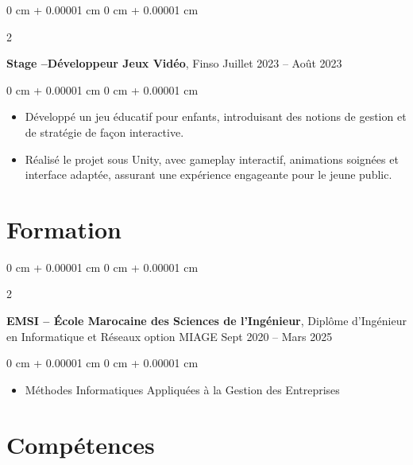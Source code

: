 \documentclass[10pt, letterpaper]{article}
\newenvironment{highlights}{
    \begin{itemize}[
        topsep=0.10 cm,
        parsep=0.10 cm,
        partopsep=0pt,
        itemsep=0pt,
        leftmargin=0 cm + 10pt
    ]
}{
    \end{itemize}
} %
\newenvironment{onecolentry}{
    \begin{adjustwidth}{
        0 cm + 0.00001 cm
    }{
        0 cm + 0.00001 cm
    }
}{
    \end{adjustwidth}
} %
\newenvironment{twocolentry}[2][]{
    \onecolentry
    \def\secondColumn{#2}
    \setcolumnwidth{\fill, 4.5 cm}
    \begin{paracol}{2}
}{
    \switchcolumn \raggedleft \secondColumn
    \end{paracol}
    \endonecolentry
} %
\begin{document}
        \vspace{0.2 cm}

        \begin{twocolentry}{
            Juillet 2023 – Août 2023
        }
            \textbf{Stage –Développeur Jeux Vidéo}, Finso\end{twocolentry}

        \vspace{0.10 cm}
        \begin{onecolentry}
            \begin{highlights}
                \item Développé un jeu éducatif pour enfants, introduisant des notions de gestion et de stratégie de façon interactive.  
                \item Réalisé le projet sous Unity, avec gameplay interactif, animations soignées et interface adaptée, assurant une expérience engageante pour le jeune public.
            \end{highlights}
        \end{onecolentry}



    \section{Formation}



        
        \begin{twocolentry}{
            Sept 2020 – Mars 2025
        }
            \textbf{EMSI – École Marocaine des Sciences de l’Ingénieur}, Diplôme d’Ingénieur en Informatique et Réseaux option MIAGE \end{twocolentry}

        \vspace{0.10 cm}
        \begin{onecolentry}
            \begin{highlights}
                \item Méthodes Informatiques Appliquées à la Gestion des Entreprises 

            \end{highlights}
        \end{onecolentry}




    
   




    
    \section{Compétences}
\end{document}

